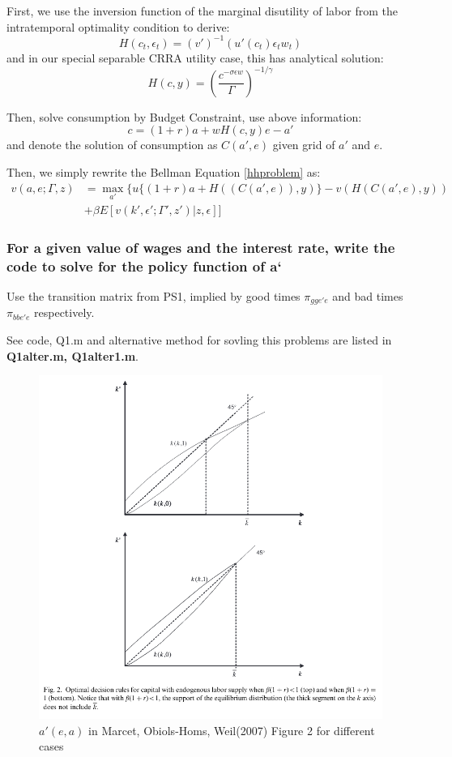 First, we use the inversion function of the marginal disutility of labor from the intratemporal optimality condition to derive: 
\[ H(c_t, \epsilon_t) = (v')^{-1}(u'(c_t)\epsilon_t w_t)\]
and in our special separable CRRA utility case, this has analytical solution: 
\[ H(c,y) = (\frac{c^{-\sigma \epsilon w}}{\Gamma})^{-1/\gamma} \]

Then, solve consumption by Budget Constraint, use above information:
\[ c = (1+r)a + w H(c,y)e  - a'\] 
and denote the solution of consumption as $C(a',e)$ given grid of $a'$ and $e$. 

Then, we simply rewrite the Bellman Equation \ref{hhproblem} as: 
\begin{align}
v(a,e; \Gamma ,z) &= \max_{a'} \{ u\{(1+r)a + H((C(a',e)),y)\}  - v(H(C(a',e),y)) \\
& + \beta E [v(k',\epsilon'; \Gamma' ,z')| z, \epsilon]]
\end{align} 

\pagebreak
\subsubsection{For a given value of wages and the interest rate, write the code to solve for the policy function of a`}

{\color{red} Use the transition matrix from PS1, implied by good times $\pi_{gge'e}$ and bad times $\pi_{bbe'e}$ respectively.}

See code,  {\color{red} Q1.m} and alternative method for sovling this problems are listed in \textbf{Q1alter.m, Q1alter1.m}.


\begin{figure}[htbp]
\centering
\includegraphics[width=\textwidth]{img/sample.png}
\caption{$a'(e,a)$ in Marcet, Obiols-Homs, Weil(2007) Figure 2 for different cases}
\end{figure}

